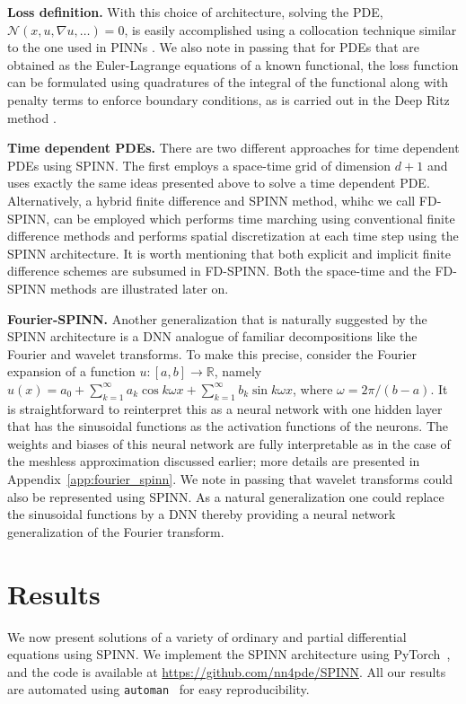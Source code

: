 \documentclass[12pt]{article}
\newcommand{\code}[1]{\lstinline{#1}}
\begin{document}
\textbf{Loss definition.} With this choice of architecture, solving the PDE, $\mathcal{N}(x, u, \nabla u, \ldots) = 0$, is easily accomplished using a collocation technique similar to the one used in PINNs \cite{RPK2019}. We also note in passing that for PDEs that are obtained as the Euler-Lagrange equations of a known functional, the loss function can be formulated using quadratures of the integral of the functional along with penalty terms to enforce boundary conditions, as is carried out in the Deep Ritz method \cite{EYu2018}.

\textbf{Time dependent PDEs.} There are two different approaches for time dependent PDEs using SPINN. The first employs a space-time grid of dimension $d + 1$ and uses exactly the same ideas presented above to solve a time dependent PDE. Alternatively, a hybrid finite difference and SPINN method, whihc we call FD-SPINN, can be employed which performs time marching using conventional finite difference methods and performs spatial discretization at each time step using the SPINN architecture. It is worth mentioning that both explicit and implicit finite difference schemes are subsumed in FD-SPINN. Both the space-time and the FD-SPINN methods are illustrated later on.


\textbf{Fourier-SPINN.} Another generalization that is naturally suggested by the SPINN architecture is a DNN analogue of familiar decompositions like the Fourier and wavelet transforms. To make this precise, consider the Fourier expansion of a function $u:[a,b] \to \mathbb{R}$, namely $u(x) = a_0 + \sum_{k=1}^{\infty} a_k \cos k\omega x + \sum_{k=1}^{\infty} b_k \sin k\omega x$, where $\omega = 2\pi/(b - a)$. It is straightforward to reinterpret this as a neural network with one hidden layer that has the sinusoidal functions as the activation functions of the neurons. The weights and biases of this neural network are fully interpretable as in the case of the meshless approximation discussed earlier; more details are presented in Appendix~\ref{app:fourier_spinn}. We note in passing that wavelet transforms could also be represented using SPINN. As a natural generalization one could replace the sinusoidal functions by a DNN thereby providing a neural network generalization of the Fourier transform.

\section*{Results}
We now present solutions of a variety of ordinary and partial differential equations using SPINN. We implement the SPINN architecture using PyTorch~\cite{pytorch}, and the code is available at \url{https://github.com/nn4pde/SPINN}. All our results are automated using \code{automan}~\cite{automan:2018} for easy reproducibility.
\end{document}
